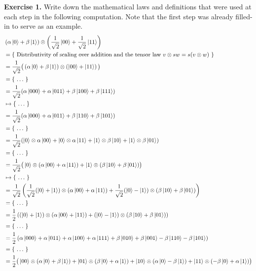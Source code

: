 \documentclass[a4paper, 11pt]{article}
\theoremstyle{definition}
\begin{document}
\noindent
\textbf{Exercise 1.} Write down the mathematical laws and definitions that were
used at each step in the following computation. Note that the first step was
already filled-in to serve as an example.
\begin{align*}
  & \left (\alpha \ket{0} + \beta \ket{1} \right ) \otimes \left
  (\frac{1}{\sqrt{2}}\ket{00} + \frac{1}{\sqrt{2}}\ket{11} \right ) \\
  & = \{\ \text{Distributivity of scaling over addition and the tensor
  law $v \otimes s w = s (v \otimes w)$}\ \} \\
  & = \frac{1}{\sqrt{2}} \big ( \left (\alpha \ket{0} + \beta \ket{1} \right )
    \otimes \left (\ket{00} + \ket{11} \right ) \big ) \\
  & = \{\ \dots\ \} \\
  & = \frac{1}{\sqrt{2}} ( \alpha \ket{000} + \alpha \ket{011} +
    \beta \ket{100} + \beta \ket{111} ) \\
  & \mapsto \{\ \dots\ \} \\
  & = \frac{1}{\sqrt{2}} ( \alpha \ket{000} + \alpha \ket{011} +
    \beta \ket{110} + \beta \ket{101} )  \\
  & = \{\ \dots\ \} \\
  & = \frac{1}{\sqrt{2}} ( \ket{0} \otimes \alpha\ket{00} + \ket{0} \otimes
    \alpha \ket{11} + \ket{1} \otimes \beta \ket{10} + \ket{1} \otimes \beta \ket{01} )
  \\
  & = \{\ \dots\ \} \\
  & = \frac{1}{\sqrt{2}} \big ( \ket{0} \otimes (\alpha\ket{00} + \alpha \ket{11}) +
    \ket{1} \otimes (\beta \ket{10} +  \beta \ket{01}) \big ) \\
  & \mapsto \{\ \dots\ \} \\
  & = \frac{1}{\sqrt{2}} \left ( \frac{1}{\sqrt{2}} (\ket{0} + \ket{1})
    \otimes (\alpha\ket{00} + \alpha \ket{11}) + \frac{1}{\sqrt{2}} (\ket{0} - \ket{1})
    \otimes (\beta \ket{10} +  \beta \ket{01}) \right ) \\
  & = \{\ \dots\ \} \\
  & = \frac{1}{2} \left ( (\ket{0} + \ket{1})
    \otimes (\alpha\ket{00} + \ket{11}) +  (\ket{0} - \ket{1})
    \otimes (\beta \ket{10} +  \beta \ket{01}) \right ) \\
  & = \{\ \dots\ \} \\
  & = \frac{1}{2} \left ( \alpha \ket{000} + \alpha \ket{011} +
    \alpha \ket{100} + \alpha \ket{111} + \beta \ket{010} + \beta \ket{001}
    - \beta \ket{110} - \beta \ket{101} \right ) \\
  & = \{\ \dots\ \} \\
  & = \frac{1}{2} \big ( \ket{00} \otimes (\alpha \ket{0} + \beta \ket{1})
    + \ket{01} \otimes (\beta \ket{0} + \alpha \ket{1}) +
    \ket{10} \otimes (\alpha \ket{0} - \beta \ket{1}) +
    \ket{11} \otimes (-\beta \ket{0}  + \alpha \ket{1} ) \big )
\end{align*}
\end{document}
